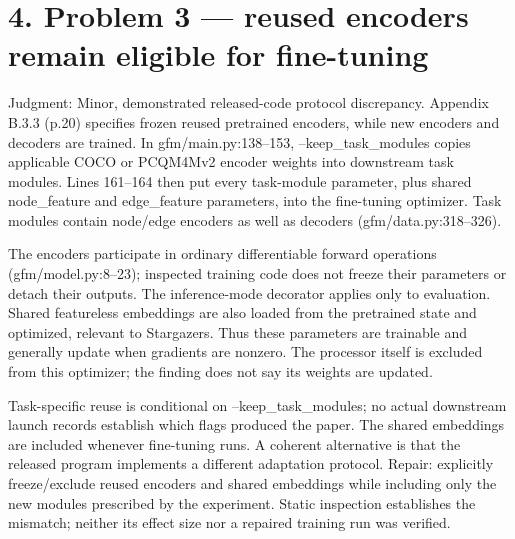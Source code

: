 \documentclass[10pt]{article}
\begin{document}
\section*{4. Problem 3 — reused encoders remain eligible for fine-tuning}
Judgment: Minor, demonstrated released-code protocol discrepancy. Appendix B.3.3 (p.20) specifies frozen reused pretrained encoders, while new encoders and decoders are trained. In gfm/main.py:138–153, –keep\_task\_modules copies applicable COCO or PCQM4Mv2 encoder weights into downstream task modules. Lines 161–164 then put every task-module parameter, plus shared node\_feature and edge\_feature parameters, into the fine-tuning optimizer. Task modules contain node/edge encoders as well as decoders (gfm/data.py:318–326).\par
The encoders participate in ordinary differentiable forward operations (gfm/model.py:8–23); inspected training code does not freeze their parameters or detach their outputs. The inference-mode decorator applies only to evaluation. Shared featureless embeddings are also loaded from the pretrained state and optimized, relevant to Stargazers. Thus these parameters are trainable and generally update when gradients are nonzero. The processor itself is excluded from this optimizer; the finding does not say its weights are updated.\par
Task-specific reuse is conditional on –keep\_task\_modules; no actual downstream launch records establish which flags produced the paper. The shared embeddings are included whenever fine-tuning runs. A coherent alternative is that the released program implements a different adaptation protocol. Repair: explicitly freeze/exclude reused encoders and shared embeddings while including only the new modules prescribed by the experiment. Static inspection establishes the mismatch; neither its effect size nor a repaired training run was verified.\par
\end{document}
